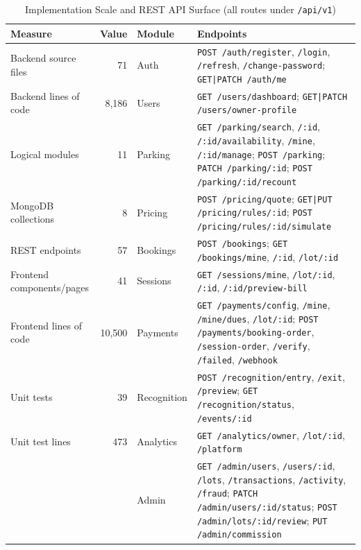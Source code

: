 \documentclass[journal,onecolumn,11pt]{IEEEtran}
\begin{document}
\begin{table}[!t]
\caption{Implementation Scale and REST API Surface (all routes under \texttt{/api/v1})}
\label{tab:scale}
\centering
\small
\begin{tabular}{@{}lr@{\qquad\qquad}lL{7.0cm}@{}}
\toprule
\textbf{Measure} & \textbf{Value} & \textbf{Module} & \textbf{Endpoints} \\
\midrule
Backend source files      & 71      & Auth & \texttt{POST /auth/register}, \texttt{/login}, \texttt{/refresh}, \texttt{/change-password}; \texttt{GET|PATCH /auth/me} \\
Backend lines of code     & 8{,}186 & Users & \texttt{GET /users/dashboard}; \texttt{GET|PATCH /users/owner-profile} \\
Logical modules           & 11      & Parking & \texttt{GET /parking/search}, \texttt{/:id}, \texttt{/:id/availability}, \texttt{/mine}, \texttt{/:id/manage}; \texttt{POST /parking}; \texttt{PATCH /parking/:id}; \texttt{POST /parking/:id/recount} \\
MongoDB collections       & 8       & Pricing & \texttt{POST /pricing/quote}; \texttt{GET|PUT /pricing/rules/:id}; \texttt{POST /pricing/rules/:id/simulate} \\
REST endpoints            & 57      & Bookings & \texttt{POST /bookings}; \texttt{GET /bookings/mine}, \texttt{/:id}, \texttt{/lot/:id} \\
Frontend components/pages & 41      & Sessions & \texttt{GET /sessions/mine}, \texttt{/lot/:id}, \texttt{/:id}, \texttt{/:id/preview-bill} \\
Frontend lines of code    & 10{,}500 & Payments & \texttt{GET /payments/config}, \texttt{/mine}, \texttt{/mine/dues}, \texttt{/lot/:id}; \texttt{POST /payments/booking-order}, \texttt{/session-order}, \texttt{/verify}, \texttt{/failed}, \texttt{/webhook} \\
Unit tests                & 39      & Recognition & \texttt{POST /recognition/entry}, \texttt{/exit}, \texttt{/preview}; \texttt{GET /recognition/status}, \texttt{/events/:id} \\
Unit test lines           & 473     & Analytics & \texttt{GET /analytics/owner}, \texttt{/lot/:id}, \texttt{/platform} \\
                          &         & Admin & \texttt{GET /admin/users}, \texttt{/users/:id}, \texttt{/lots}, \texttt{/transactions}, \texttt{/activity}, \texttt{/fraud}; \texttt{PATCH /admin/users/:id/status}; \texttt{POST /admin/lots/:id/review}; \texttt{PUT /admin/commission} \\
\bottomrule
\end{tabular}
\end{table}
\end{document}
